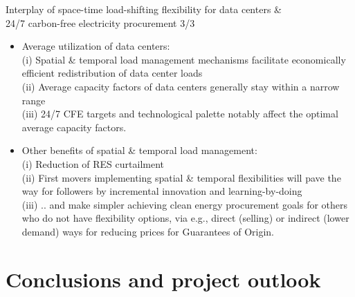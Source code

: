 \begin{frame}{Interplay of space-time load-shifting flexibility for data centers \& \\ 
  24/7 carbon-free electricity procurement 3/3}

{\footnotesize
\begin{itemize}

  \item Average utilization of data centers:\\
        (i) Spatial \& temporal load management mechanisms facilitate \alert{economically efficient redistribution} of data center loads \\
        (ii) Average capacity factors of data centers generally stay within a narrow range \\
        (iii) 24/7 CFE targets and technological palette notably affect the optimal average capacity factors.

  \item Other benefits of spatial \& temporal load management: \\
        (i) \alert{Reduction of RES curtailment} \\
        (ii) First movers implementing spatial \& temporal flexibilities will \alert{pave the way for followers} by incremental innovation and learning-by-doing \\
        (iii) .. and make \alert{simpler achieving clean energy procurement goals for others} who do not have flexibility options, via e.g., 
        direct (selling) or indirect (lower demand) ways for reducing prices for Guarantees of Origin.

\end{itemize}
}

\end{frame}


\section{Conclusions and project outlook}

